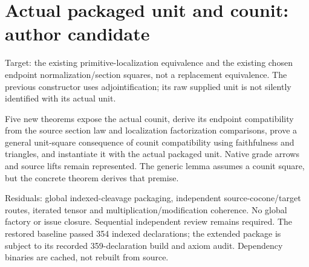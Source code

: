\documentclass{article}
\begin{document}
\section*{Actual packaged unit and counit: author candidate}
Target: the existing primitive-localization equivalence and the existing chosen endpoint normalization/section squares, not a replacement equivalence. The previous constructor uses adjointification; its raw supplied unit is not silently identified with its actual unit.

Five new theorems expose the actual counit, derive its endpoint compatibility from the source section law and localization factorization comparisons, prove a general unit-square consequence of counit compatibility using faithfulness and triangles, and instantiate it with the actual packaged unit. Native grade arrows and source lifts remain represented. The generic lemma assumes a counit square, but the concrete theorem derives that premise.

Residuals: global indexed-cleavage packaging, independent source-cocone/target routes, iterated tensor and multiplication/modification coherence. No global factory or issue closure. Sequential independent review remains required. The restored baseline passed 354 indexed declarations; the extended package is subject to its recorded 359-declaration build and axiom audit. Dependency binaries are cached, not rebuilt from source.
\end{document}
